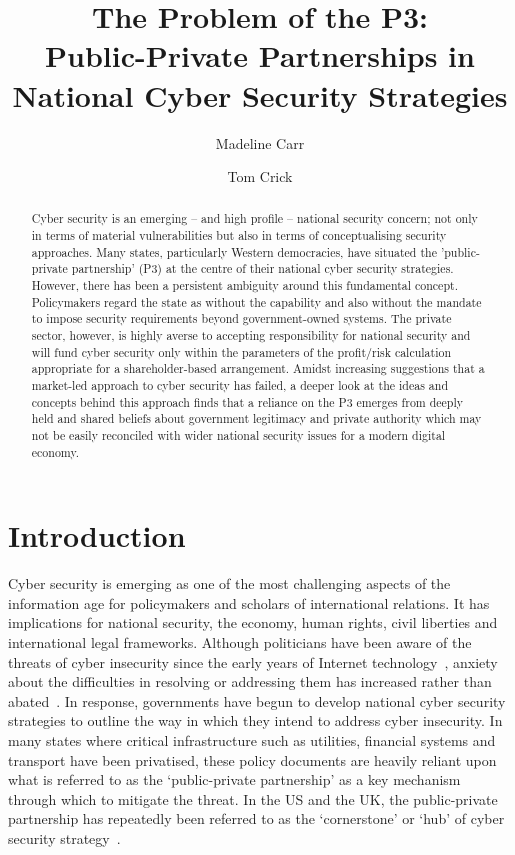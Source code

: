 \documentclass[a4paper,11pt]{article}
\title{\vspace{-2em}The Problem of the P3:\\Public-Private Partnerships in National Cyber Security Strategies}
\author[1]{Madeline Carr}
\author[2]{Tom Crick}
\affil[1]{Department of International Politics, Aberystwyth University}
\affil[2]{Department of Computing \& Information Systems, Cardiff Metropolitan University}
\affil[1]{\protect\url{madeline.carr@aber.ac.uk}}
\affil[2]{\protect\url{tcrick@cardiffmet.ac.uk}}
\date{ }
\begin{document}
\maketitle

\begin{abstract}
Cyber security is an emerging -- and high profile -- national security
concern; not only in terms of material vulnerabilities but also in
terms of conceptualising security approaches. Many states,
particularly Western democracies, have situated the
'public-private partnership' (P3) at the centre of their national
cyber security strategies. However, there has been a persistent
ambiguity around this fundamental concept. Policymakers regard the
state as without the capability and also without the mandate to impose
security requirements beyond government-owned systems. The private
sector, however, is highly averse to accepting responsibility for
national security and will fund cyber security only within the
parameters of the profit/risk calculation appropriate for a
shareholder-based arrangement. Amidst increasing suggestions that a
market-led approach to cyber security has failed, a deeper look at the
ideas and concepts behind this approach finds that a reliance on the
P3 emerges from deeply held and shared beliefs about government
legitimacy and private authority which may not be easily reconciled
with wider national security issues for a modern digital economy.
\end{abstract}

\section{Introduction}

Cyber security is emerging as one of the most challenging aspects of
the information age for policymakers and scholars of international
relations. It has implications for national security, the economy,
human rights, civil liberties and international legal
frameworks. Although politicians have been aware of the threats of
cyber insecurity since the early years of Internet
technology~\cite{clinton:1992}, anxiety about the difficulties in
resolving or addressing them has increased rather than
abated~\cite{obama:2009}. In response, governments have begun to
develop national cyber security strategies to outline the way in which
they intend to address cyber insecurity. In many states where critical
infrastructure such as utilities, financial systems and transport have
been privatised, these policy documents are heavily reliant upon what
is referred to as the `public-private partnership' as a key mechanism
through which to mitigate the threat. In the US and the UK, the
public-private partnership has repeatedly been referred to as the
`cornerstone' or `hub' of cyber security
strategy~\cite{clinton:1992,gwbush:2003,maude:2012}.
\end{document}
